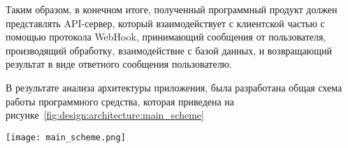 Таким образом, в конечном итоге, полученный программный продукт должен представлять API-сервер, который взаимодействует с клиентской частью с помощью протокола WebHook, принимающий сообщения от пользователя, производящий обработку, взаимодействие с базой данных, и возвращающий результат в виде ответного сообщения пользователю.

В результате анализа архитектуры приложения, была разработана общая схема работы программного средства, которая приведена на рисунке~\ref{fig:design:architecture:main_scheme}

\begin{sidewaysfigure}
\centering
	\texttt{[image: main\_scheme.png]}
	\caption{Общая схема работы программного средства}
	\label{fig:design:architecture:main_scheme}
\end{sidewaysfigure}

